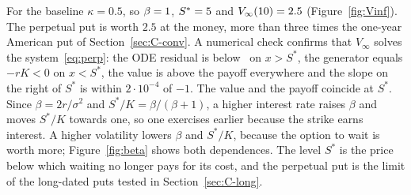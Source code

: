 For the baseline $\kappa=0.5$, so $\beta=1$, $S^*=5$ and $V_\infty(10)=2.5$ (Figure~\ref{fig:Vinf}).
The perpetual put is worth $2.5$ at the money, more than three times the one-year American put of Section~\ref{sec:C-conv}.
A numerical check confirms that $V_\infty$ solves the system~\eqref{eq:perp}: the ODE residual is below \PerpResidual\ on $x>S^*$, the generator equals $-rK<0$ on $x<S^*$, the value is above the payoff everywhere and the slope on the right of $S^*$ is within $2\cdot10^{-4}$ of $-1$.
The value and the payoff coincide at $S^*$.
Since $\beta=2r/\sigma^2$ and $S^*/K=\beta/(\beta+1)$, a higher interest rate raises $\beta$ and moves $S^*/K$ towards one, so one exercises earlier because the strike earns interest.
A higher volatility lowers $\beta$ and $S^*/K$, because the option to wait is worth more; Figure~\ref{fig:beta} shows both dependences.
The level $S^*$ is the price below which waiting no longer pays for its cost, and the perpetual put is the limit of the long-dated puts tested in Section~\ref{sec:C-long}.
